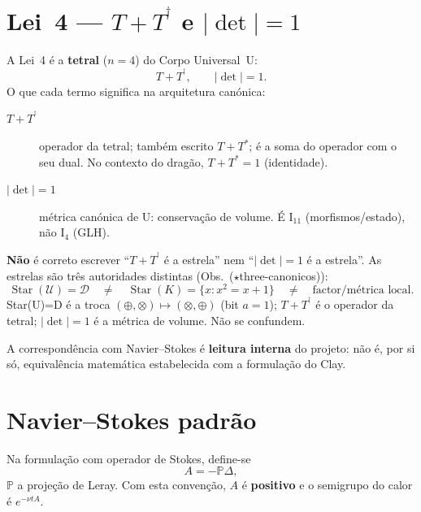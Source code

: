 \documentclass[11pt,a4paper]{article}
\newcommand\dg{^{\dagger}}
\begin{document}
\section{Lei~4 --- $T+T^{\dg}$ e $|\det|=1$}\label{sec:lei4}

A Lei~4 é a \textbf{tetral} ($n=4$) do Corpo Universal~U:
\begin{equation}\label{eq:lei4}
T+T^{\dg},\qquad |\det|=1.
\end{equation}
O que cada termo significa na arquitetura canónica:

\begin{description}
\item[$T+T^{\dg}$] operador da tetral; também escrito
  $T+T^{*}$; é a soma do operador com o seu dual.
  No contexto do dragão, $T+T^{*}=1$ (identidade).
\item[$|\det|=1$] métrica canónica de U: conservação de volume.
  É $\mathrm{I}_{11}$ (morfismos/estado), não $\mathrm{I}_{4}$
  (GLH).
\end{description}

\textbf{Não} é correto escrever ``$T+T^{\dg}$ é a estrela'' nem
``$|\det|=1$ é a estrela''. As estrelas são três autoridades
distintas (Obs.~($\star$three-canonicos)):
\begin{equation}\label{eq:tres-estrelas}
\operatorname{Star}(\mathcal{U})=\mathcal{D}
\quad\neq\quad
\operatorname{Star}(K)=\{x:x^{2}=x+1\}
\quad\neq\quad
\text{factor/métrica local}.
\end{equation}
Star(U)=D é a troca $(\oplus,\otimes)\mapsto(\otimes,\oplus)$
(bit $a=1$); $T+T^{\dg}$ é o operador da tetral;
$|\det|=1$ é a métrica de volume. Não se confundem.

A correspondência com Navier--Stokes é \textbf{leitura interna}
do projeto: não é, por si só, equivalência matemática
estabelecida com a formulação do Clay.

\section{Navier--Stokes padrão}\label{sec:ns-padrao}

Na formulação com operador de Stokes, define-se
\begin{equation}\label{eq:stokes}
A = -\mathbb P\Delta,
\end{equation}
$\mathbb P$ a projeção de Leray. Com esta convenção,
$A$ é \textbf{positivo} e o semigrupo do calor é
$e^{-\nu tA}$.
\end{document}
